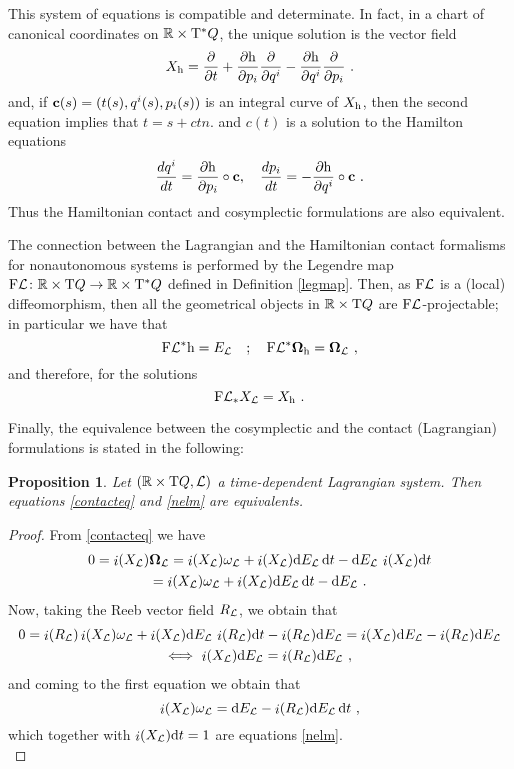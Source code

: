 \documentclass[12pt]{report}
\newtheorem{prop}[teor]{Proposition}
\def\derpar#1#2{\frac{\partial{#1}}{\partial{#2}}}
\def\qed{\ifvmode\removelastskip\fi
{\unskip\nobreak\hfil\penalty50\hbox{}\nobreak\hfil
\hbox{\vrule height1.2ex width1.2ex}\parfillskip=0pt
\finalhyphendemerits=0 \par\smallskip}}
\def\Lag{{\cal L}}
\def\d{{\rm d}}
\def\Real{\mathbb{R}}
\def\Tan{{\rm T}}
\def\inn{\mathop{i}\nolimits}
\begin{document}
This system of equations is compatible and determinate.
In fact, in a chart of canonical coordinates  on $\Real\times\Tan^*Q$,
the unique solution is the vector field
$$
X_{\rm h} =\derpar{}{t}+ \derpar{{\rm h}}{p_i} \derpar{}{q^i} -
      \derpar{{\rm h}}{q^i} \derpar{}{p_i} \ .
$$
and, if ${\bf c}(s)=(t(s),q^i(s), p_i(s))$ is an integral curve of $X_{\rm h}$,
then the second equation implies that $t=s+ctn.$ and $c(t)$
is a solution to the Hamilton equations
\[
\frac{dq^i}{dt} = \frac{\partial {\rm h}}{\partial p_i}\circ{\bf c} ,\quad 
\frac{dp_i}{dt}= -\frac{\partial {\rm h}}{\partial q^i}\circ{\bf c}\ .
\]
Thus the Hamiltonian contact and cosymplectic formulations are also equivalent. 

The connection between the Lagrangian and the
Hamiltonian contact formalisms for nonautonomous systems is performed by the Legendre map
${\rm F}\Lag\colon\Real\times\Tan Q \to \Real\times\Tan^*Q$
defined in Definition \ref{legmap}.
Then, as ${\rm F}\Lag$  is a (local) diffeomorphism,
then all the geometrical objects in
$\Real\times\Tan Q$ are ${\rm F}\Lag$-projectable;
in particular we have that
$$
{\rm F}\Lag^*{\rm h}=E_\Lag \quad ; \quad
{\rm F}\Lag^*\mbox{\boldmath $\Omega$}_{\rm h} =\mbox{\boldmath $\Omega$}_{\cal L} \ ,
$$
and therefore, for the solutions
$$
{\rm F}\Lag_*X_{\cal L} = X_{\rm h} \ .
$$

Finally, the equivalence between the cosymplectic and the contact (Lagrangian) formulations is stated in the following:

\begin{prop}
Let $(\Real\times\Tan Q,\Lag)$ a time-dependent Lagrangian system.
Then equations \eqref{contacteq} and \eqref{nelm} are equivalents.
\end{prop}
\begin{proof}
From \eqref{contacteq} we have
\begin{multline*}
0=\inn(X_{\cal L})\mbox{\boldmath $\Omega$}_\Lag =
\inn(X_{\cal L})\omega_\Lag+ \inn(X_{\cal L})\d E_\Lag\,\d t-
\d E_\Lag\, \inn(X_{\cal L})\d t \\
=\inn(X_{\cal L})\omega_\Lag+ \inn(X_{\cal L})\d E_\Lag\,\d t-
\d E_\Lag \ .
\end{multline*}
  Now, taking the Reeb vector field $R_\Lag$, we obtain that
\begin{multline*}
0=\inn(R_\Lag)\inn(X_{\cal L})\omega_\Lag+ \inn(X_{\cal L})\d E_\Lag\,\inn(R_\Lag)\d t-\inn(R_\Lag)\d E_\Lag=
 \inn(X_{\cal L})\d E_\Lag-\inn(R_\Lag)\d E_\Lag \\
 \Longleftrightarrow \ \inn(X_{\cal L})\d E_\Lag=\inn(R_\Lag)\d E_\Lag \ ,
\end{multline*}
and coming to the first equation we obtain that
$$
\inn(X_{\cal L})\omega_\Lag=
\d E_\Lag- \inn(R_{\cal L})\d E_\Lag\,\d t \ ,
$$
which together with $\inn(X_{\cal L})\d t=1$ are equations \eqref{nelm}.
\\ \qed\end{proof}
\end{document}
